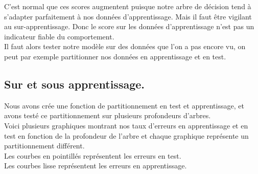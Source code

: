 \documentclass{article}
\begin{document}
C'est normal que ces scores augmentent puisque notre arbre de décision tend à s'adapter parfaitement à nos données d'apprentissage. Mais il faut être vigilant au sur-apprentissage. Donc le score sur les données d'apprentissage n'est pas un indicateur fiable du comportement.\\
Il faut alors tester notre modèle sur des données que l'on a pas encore vu, on peut par exemple partitionner nos données en apprentissage et en test.\\
\subsection{Sur et sous apprentissage.}
Nous avons crée une fonction de partitionnement en test et apprentissage, et avons testé ce partitionnement sur plusieurs profondeurs d'arbres.\\
Voici plusieurs graphiques montrant nos taux d'erreurs en apprentissage et en test en fonction de la profondeur de l'arbre et chaque graphique représente un partitionnement différent.\\ 
Les courbes en pointillés représentent les erreurs en test.\\
Les courbes lisse représentent les erreurs en apprentissage.
\end{document}
